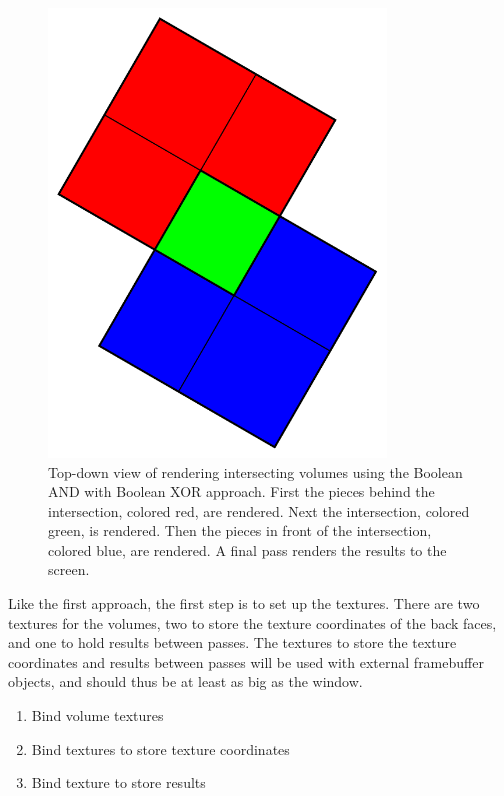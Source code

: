 \documentclass{article}
\begin{document}
\begin{figure}
\centering
\includegraphics[width=0.8\textwidth]{boolean-xor.pdf}
\caption{
Top-down view of rendering intersecting volumes using the Boolean AND with
Boolean XOR approach.  First the pieces behind the intersection, colored red,
are rendered.  Next the intersection, colored green, is rendered.  Then the
pieces in front of the intersection, colored blue, are rendered.  A final pass
renders the results to the screen.
}
\label{boolean-xor}
\end{figure}

Like the first approach, the first step is to set up the textures.  There are
two textures for the volumes, two to store the texture coordinates of the back
faces, and one to hold results between passes.  The textures to store the
texture coordinates and results between passes will be used with external
framebuffer objects, and should thus be at least as big as the window.

\begin{enumerate}
  \item Bind volume textures
  \item Bind textures to store texture coordinates
  \item Bind texture to store results
\end{enumerate}
\end{document}
